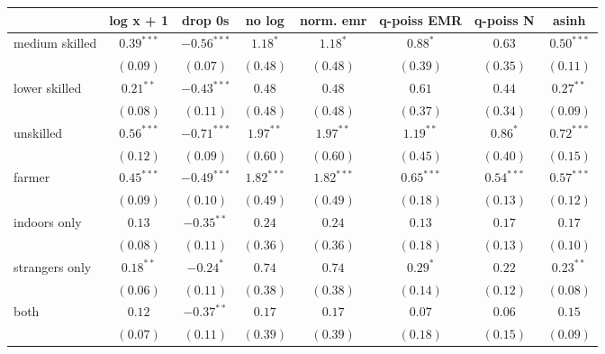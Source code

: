 
\begin{table}
\begin{center}
\begin{tabular}{l c c c c c c c}
\hline
 & log x + 1 & drop 0s & no log & norm. emr & q-poiss EMR & q-poiss N  & asinh \\
\hline
medium skilled & $0.39^{***}$  & $-0.56^{***}$ & $1.18^{*}$    & $1.18^{*}$    & $0.88^{*}$    & $0.63$        & $0.50^{***}$  \\
               & $(0.09)$      & $(0.07)$      & $(0.48)$      & $(0.48)$      & $(0.39)$      & $(0.35)$      & $(0.11)$      \\
lower skilled  & $0.21^{**}$   & $-0.43^{***}$ & $0.48$        & $0.48$        & $0.61$        & $0.44$        & $0.27^{**}$   \\
               & $(0.08)$      & $(0.11)$      & $(0.48)$      & $(0.48)$      & $(0.37)$      & $(0.34)$      & $(0.09)$      \\
unskilled      & $0.56^{***}$  & $-0.71^{***}$ & $1.97^{**}$   & $1.97^{**}$   & $1.19^{**}$   & $0.86^{*}$    & $0.72^{***}$  \\
               & $(0.12)$      & $(0.09)$      & $(0.60)$      & $(0.60)$      & $(0.45)$      & $(0.40)$      & $(0.15)$      \\
farmer         & $0.45^{***}$  & $-0.49^{***}$ & $1.82^{***}$  & $1.82^{***}$  & $0.65^{***}$  & $0.54^{***}$  & $0.57^{***}$  \\
               & $(0.09)$      & $(0.10)$      & $(0.49)$      & $(0.49)$      & $(0.18)$      & $(0.13)$      & $(0.12)$      \\
indoors only   & $0.13$        & $-0.35^{**}$  & $0.24$        & $0.24$        & $0.13$        & $0.17$        & $0.17$        \\
               & $(0.08)$      & $(0.11)$      & $(0.36)$      & $(0.36)$      & $(0.18)$      & $(0.13)$      & $(0.10)$      \\
strangers only & $0.18^{**}$   & $-0.24^{*}$   & $0.74$        & $0.74$        & $0.29^{*}$    & $0.22$        & $0.23^{**}$   \\
               & $(0.06)$      & $(0.11)$      & $(0.38)$      & $(0.38)$      & $(0.14)$      & $(0.12)$      & $(0.08)$      \\
both           & $0.12$        & $-0.37^{**}$  & $0.17$        & $0.17$        & $0.07$        & $0.06$        & $0.15$        \\
               & $(0.07)$      & $(0.11)$      & $(0.39)$      & $(0.39)$      & $(0.18)$      & $(0.15)$      & $(0.09)$      \\

\end{tabular}
\end{center}
\end{table}
